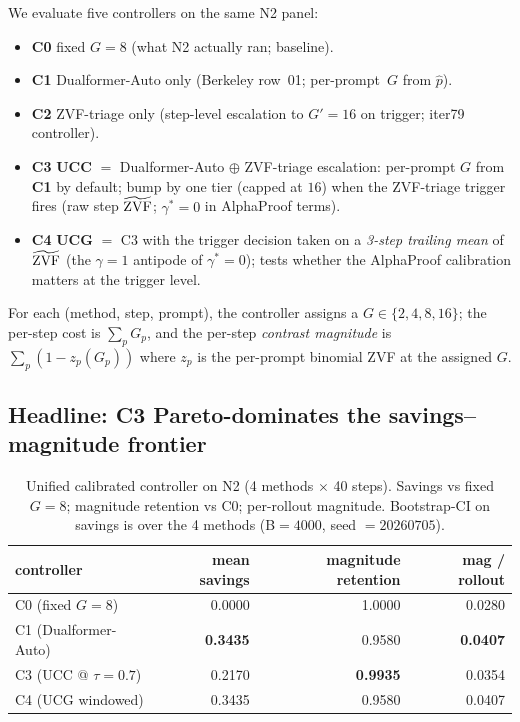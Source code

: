 We evaluate five controllers on the same N2 panel:
\begin{itemize}
\item \textbf{C0} fixed $G{=}8$ (what N2 actually ran; baseline).
\item \textbf{C1} Dualformer-Auto only (Berkeley row~01; per-prompt~$G$
from $\hat p$).
\item \textbf{C2} ZVF-triage only (step-level escalation to $G'{=}16$ on
trigger; iter79 controller).
\item \textbf{C3} \textbf{UCC} $=$ Dualformer-Auto $\oplus$ ZVF-triage
escalation: per-prompt $G$ from \textbf{C1} by default; bump by one tier
(capped at $16$) when the ZVF-triage trigger fires (raw step $\widetilde{\mathrm{ZVF}}$;
$\gamma^*{=}0$ in AlphaProof terms).
\item \textbf{C4} \textbf{UCG} $=$ C3 with the trigger decision taken on a
\emph{3-step trailing mean} of $\widetilde{\mathrm{ZVF}}$ (the $\gamma{=}1$ antipode of
$\gamma^*{=}0$); tests whether the AlphaProof calibration matters at the
trigger level.
\end{itemize}

For each (method, step, prompt), the controller assigns a $G \in \{2,4,8,16\}$;
the per-step cost is $\sum_p G_p$, and the per-step
\emph{contrast magnitude} is $\sum_p (1 - z_{p}(G_p))$ where $z_p$ is
the per-prompt binomial ZVF at the assigned $G$.

\subsection{Headline: C3 Pareto-dominates the savings--magnitude frontier}

\begin{table}[t]
\centering\small
\caption{Unified calibrated controller on N2 (4 methods $\times$ 40 steps).
Savings vs fixed $G{=}8$; magnitude retention vs C0; per-rollout magnitude.
Bootstrap-CI on savings is over the 4 methods (B$=4000$, seed $=20260705$).}
\label{tab:p7-iter103-headline}
\vspace{2pt}
\begin{tabular}{lrrr}
\toprule
controller & mean savings & magnitude retention & mag / rollout \\
\midrule
C0 (fixed $G{=}8$)        &  0.0000 & 1.0000 & 0.0280 \\
C1 (Dualformer-Auto)      &  \textbf{0.3435} & 0.9580 & \textbf{0.0407} \\
C3 (UCC @ $\tau{=}0.7$)    &  0.2170 & \textbf{0.9935} & 0.0354 \\
C4 (UCG windowed)         &  0.3435 & 0.9580 & 0.0407 \\
\bottomrule
\end{tabular}
\end{table}

